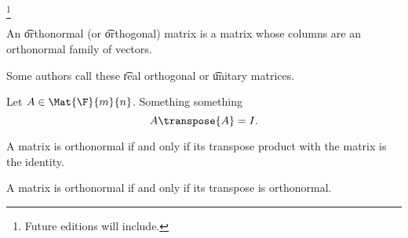 
\footnote{Future editions will include.}



An \t{orthonormal} (or \t{orthogonal}) matrix is a matrix whose columns are an orthonormal family of vectors.

Some authors call these \t{real orthogonal} or \t{unitary} matrices.


Let $A \in \Mat{\F}{m}{n}$.
Something something
\[
  A\transpose{A} = I.
\]


\begin{proposition}

  A matrix is orthonormal if and only if its transpose product with the matrix is the identity.

\end{proposition}

\begin{proposition}

A matrix is orthonormal if and only if its transpose is orthonormal.

\end{proposition}

\blankpage
